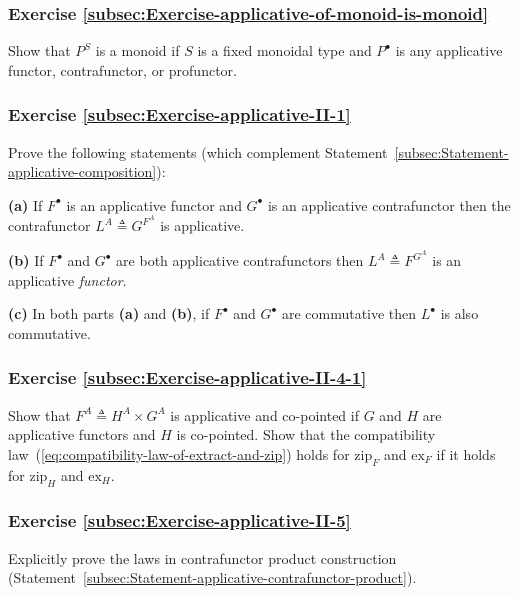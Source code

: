 \subsubsection{Exercise \label{subsec:Exercise-applicative-of-monoid-is-monoid}\ref{subsec:Exercise-applicative-of-monoid-is-monoid}}

Show that $P^{S}$ is a monoid if $S$ is a fixed monoidal type and
$P^{\bullet}$ is any applicative functor, contrafunctor, or profunctor.

\subsubsection{Exercise \label{subsec:Exercise-applicative-II-1}\ref{subsec:Exercise-applicative-II-1}}

Prove the following statements (which complement Statement~\ref{subsec:Statement-applicative-composition}):

\textbf{(a)} If $F^{\bullet}$ is an applicative functor and $G^{\bullet}$
is an applicative contrafunctor then the contrafunctor $L^{A}\triangleq G^{F^{A}}$
is applicative.

\textbf{(b)} If $F^{\bullet}$ and $G^{\bullet}$ are both applicative
contrafunctors then $L^{A}\triangleq F^{G^{A}}$ is an applicative
\emph{functor}.

\textbf{(c)} In both parts \textbf{(a)} and \textbf{(b)}, if $F^{\bullet}$
and $G^{\bullet}$ are commutative then $L^{\bullet}$ is also commutative.

\subsubsection{Exercise \label{subsec:Exercise-applicative-II-4-1}\ref{subsec:Exercise-applicative-II-4-1}}

Show that $F^{A}\triangleq H^{A}\times G^{A}$ is applicative and
co-pointed if $G$ and $H$ are applicative functors and $H$ is co-pointed.
Show that the compatibility law~(\ref{eq:compatibility-law-of-extract-and-zip})
holds for $\text{zip}_{F}$ and $\text{ex}_{F}$ if it holds for $\text{zip}_{H}$
and $\text{ex}_{H}$.

\subsubsection{Exercise \label{subsec:Exercise-applicative-II-5}\ref{subsec:Exercise-applicative-II-5}}

Explicitly prove the laws in contrafunctor product construction (Statement~\ref{subsec:Statement-applicative-contrafunctor-product}).

